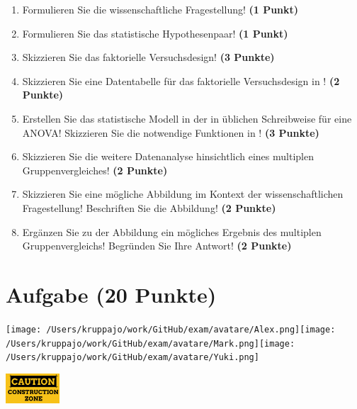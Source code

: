\documentclass[a4paper, 9pt]{scrartcl}\usepackage[]{graphicx}\usepackage[]{xcolor}
\begin{document}
\begin{enumerate}
  \setcounter{enumi}{0}
  \item Formulieren Sie die wissenschaftliche Fragestellung! \textbf{(1 Punkt)}
  \item Formulieren Sie das statistische Hypothesenpaar! \textbf{(1 Punkt)}
  \item Skizzieren Sie das faktorielle Versuchsdesign! \textbf{(3 Punkte)}
  \item Skizzieren Sie eine Datentabelle für das faktorielle Versuchsdesign in \Rlogo! \textbf{(2 Punkte)}
  \item Erstellen Sie das statistische Modell in der in \Rlogo üblichen Schreibweise für eine ANOVA! Skizzieren Sie die notwendige Funktionen in \Rlogo! \textbf{(3 Punkte)}
  \item Skizzieren Sie die weitere Datenanalyse hinsichtlich eines multiplen Gruppenvergleiches! \textbf{(2 Punkte)}
  \item Skizzieren Sie eine mögliche Abbildung im Kontext der wissenschaftlichen Fragestellung! Beschriften Sie die Abbildung! \textbf{(2 Punkte)}
  \item Ergänzen Sie zu der Abbildung ein mögliches Ergebnis des multiplen Gruppenvergleichs! Begründen Sie Ihre Antwort! \textbf{(2 Punkte)}
\end{enumerate}


 
\clearpage

\section{Aufgabe \hfill (20 Punkte)}


 
\begin{minipage}[t]{0.5\textwidth}
\texttt{[image: /Users/kruppajo/work/GitHub/exam/avatare/Alex.png]}\hspace{-4mm}\texttt{[image: /Users/kruppajo/work/GitHub/exam/avatare/Mark.png]}\hspace{-4mm}\texttt{[image: /Users/kruppajo/work/GitHub/exam/avatare/Yuki.png]}
\end{minipage}
\begin{minipage}[t]{0.5\textwidth}
\hfill
\href{https://youtu.be/wJqsNV1hOW8}{\includegraphics[width = 2cm]{img/caution}}
\end{minipage}
\vspace{1ex}
\end{document}
